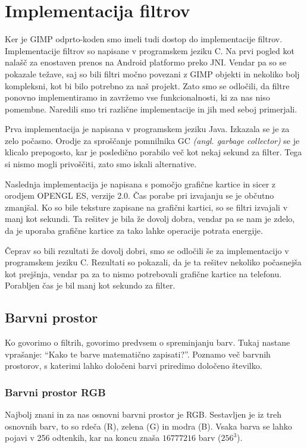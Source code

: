 \section{Implementacija filtrov}
Ker je GIMP odprto-koden smo imeli tudi dostop do implementacije filtrov.
Implementacije filtrov so napisane v programskem jeziku C. Na prvi pogled kot
nalašč za enostaven prenos na Android platformo preko JNI. Vendar pa so se
pokazale težave, saj so bili filtri močno povezani z GIMP objekti in nekoliko
bolj kompleksni, kot bi bilo potrebno za naš projekt. Zato smo se odločili, da
filtre ponovno implementiramo in zavržemo vse funkcionalnosti, ki za nas niso
pomembne. Naredili smo tri različne implementacije in jih med seboj primerjali.

Prva implementacija je napisana v programskem jeziku Java. Izkazala se je za
zelo počasno. Orodje za sproščanje pomnilnika GC \textit{(angl. garbage
collector)} se je klicalo prepogosto, kar je posledično porabilo več kot nekaj
sekund za filter. Tega si nismo mogli privoščiti, zato smo iskali alternative.

Naslednja implementacija je napisana s pomočjo grafične kartice in sicer z
orodjem OPENGL ES, verzije 2.0. Čas porabe pri izvajanju se je občutno
zmanjšal. Ko so bile teksture zapisane na grafični kartici, so se filtri
izvajali v manj kot sekundi. Ta rešitev je bila že dovolj dobra, vendar pa se
nam je zdelo, da je uporaba grafične kartice za tako lahke operacije potrata
energije.

Čeprav so bili rezultati že dovolj dobri, smo se odločili še za implementacijo
v programskem jeziku C. Rezultati so pokazali, da je ta rešitev nekoliko
počasnejša kot prejšnja, vendar pa za to nismo potrebovali grafične kartice na
telefonu. Porabljen čas je bil manj kot sekundo za filter.


\subsection{Barvni prostor}
Ko govorimo o filtrih, govorimo predvsem o spreminjanju barv. Tukaj nastane
vprašanje: ``Kako te barve matematično zapisati?''. Poznamo več barvnih
prostorov, s katerimi lahko določeni barvi priredimo določeno številko.


\subsubsection*{Barvni prostor RGB}
Najbolj znani in za nas osnovni barvni prostor je RGB. Sestavljen je iz treh
osnovnih barv, to so rdeča (R), zelena (G) in modra (B). Vsaka barva se lahko
pojavi v 256 odtenkih, kar na koncu znaša $16777216$ barv ($256^3$).

